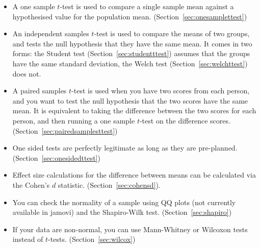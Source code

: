 \begin{itemize} \itemsep -2pt
\item A one sample $t$-test is used to compare a single sample mean against a hypothesised value for the population mean. (Section~\ref{sec:onesamplettest})
\item An independent samples $t$-test is used to compare the means of two groups, and tests the null hypothesis that they have the same mean. It comes in two forms: the Student test (Section~\ref{sec:studentttest}) assumes that the groups have the same standard deviation, the Welch test (Section~\ref{sec:welchttest}) does not.
\item A paired samples $t$-test is used when you have two scores from each person, and you want to test the null hypothesis that the two scores have the same mean. It is equivalent to taking the difference between the two scores for each person, and then running a one sample $t$-test on the difference scores. (Section~\ref{sec:pairedsamplesttest})
\item One sided tests are perfectly legitimate as long as they are pre-planned. (Section~\ref{sec:onesidedttest})
\item Effect size calculations for the difference between means can be calculated via the Cohen's $d$ statistic. (Section~\ref{sec:cohensd}).
\item You can check the normality of a sample using QQ plots (not currently available in jamovi) and the Shapiro-Wilk test. (Section~\ref{sec:shapiro})
\item If your data are non-normal, you can use Mann-Whitney or Wilcoxon tests instead of $t$-tests. (Section~\ref{sec:wilcox})
\end{itemize}








